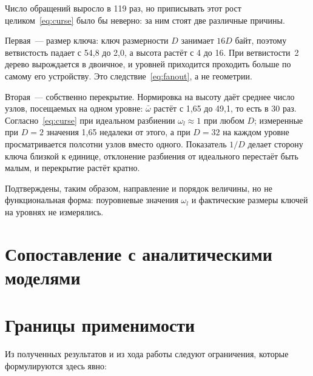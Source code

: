Число обращений выросло в 119 раз, но приписывать этот рост
целиком~\eqref{eq:curse} было бы неверно: за ним стоят две различные причины.

Первая~--- размер ключа: ключ  размерности $D$ занимает $16D$ байт,
поэтому ветвистость падает с 54,8 до 2,0, а высота растёт с 4 до 16. При
ветвистости~2 дерево вырождается в двоичное, и уровней приходится проходить
больше по самому его устройству. Это следствие~\eqref{eq:fanout}, а не
геометрии.

Вторая~--- собственно перекрытие. Нормировка на высоту даёт среднее число узлов,
посещаемых на одном уровне: $\bar\omega$ растёт с 1,65 до 49,1, то есть в 30
раз. Согласно~\eqref{eq:curse} при идеальном разбиении $\omega_l \approx 1$ при
любом $D$; измеренные при $D=2$ значения 1,65 недалеки от этого, а при $D=32$ на
каждом уровне просматривается полсотни узлов вместо одного. Показатель $1/D$
делает сторону ключа близкой к единице, отклонение разбиения от идеального
перестаёт быть малым, и перекрытие растёт кратно.

Подтверждены, таким образом, направление и порядок величины, но не
функциональная форма: поуровневые значения $\omega_l$ и фактические размеры
ключей на уровнях не измерялись.

\section{Сопоставление с аналитическими моделями}


\section{Границы применимости}

Из полученных результатов и из хода работы следуют ограничения, которые
формулируются здесь явно:

